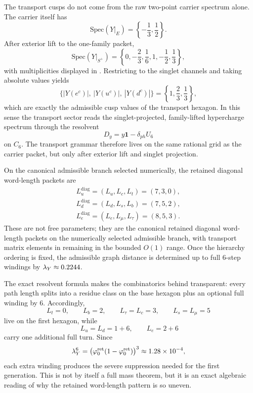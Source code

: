 \begin{remark}
The transport cusps do not come from the raw two-point carrier spectrum alone. The carrier itself has
\[
\mathrm{Spec}(Y|_E)=\left\{-\frac13,\frac12\right\}.
\]
After exterior lift to the one-family packet,
\[
\mathrm{Spec}(Y|_{S^+})
=
\left\{0,-\frac23,\frac16,1,-\frac12,\frac13\right\},
\]
with multiplicities displayed in . Restricting to the singlet channels and taking absolute values yields
\[
\{|Y(e^c)|,\ |Y(u^c)|,\ |Y(d^c)|\}
=
\left\{1,\frac23,\frac13\right\},
\]
which are exactly the admissible cusp values of the transport hexagon. In this sense the transport sector reads the singlet-projected, family-lifted hypercharge spectrum through the resolvent
\[
D_y=y\mathbf 1-\delta_{ph}U_6
\]
on $C_6$. The transport grammar therefore lives on the same rational grid as the carrier packet, but only after exterior lift and singlet projection.
\end{remark}

On the canonical admissible branch selected numerically, the retained diagonal word-length packets are
\begin{equation}
\label{eq:minimal-word-lengths}
\begin{gathered}
L_u^{\mathrm{diag}}=(L_u,L_c,L_t)=(7,3,0),\\
L_d^{\mathrm{diag}}=(L_d,L_s,L_b)=(7,5,2),\\
L_e^{\mathrm{diag}}=(L_e,L_\mu,L_\tau)=(8,5,3).
\end{gathered}
\end{equation}
These are not free parameters; they are the canonical retained diagonal word-length packets on the numerically selected admissible branch, with transport matrix elements in  remaining in the bounded $O(1)$ range. Once the hierarchy ordering is fixed, the admissible graph distance is determined up to full $6$-step windings by $\lambda_Y\approx\num{0.2244}$.

\begin{remark}
The exact resolvent formula  makes the combinatorics behind  transparent: every path length splits into a residue class on the base hexagon plus an optional full winding by $6$. Accordingly,
\[
L_t=0,\qquad
L_b=2,\qquad
L_\tau=L_c=3,\qquad
L_s=L_\mu=5
\]
live on the first hexagon, while
\[
\;L_u=L_d=1+6,
\qquad
L_e=2+6
\]
carry one additional full turn. Since
\[
\lambda_Y^6=\bigl(\varphi_0^{\mathrm{ret}}(1-\varphi_0^{\mathrm{ret}})\bigr)^3\approx \num{1.28e-4},
\]
each extra winding produces the severe suppression needed for the first generation. This is not by itself a full mass theorem, but it is an exact algebraic reading of why the retained word-length pattern is so uneven.
\end{remark}

